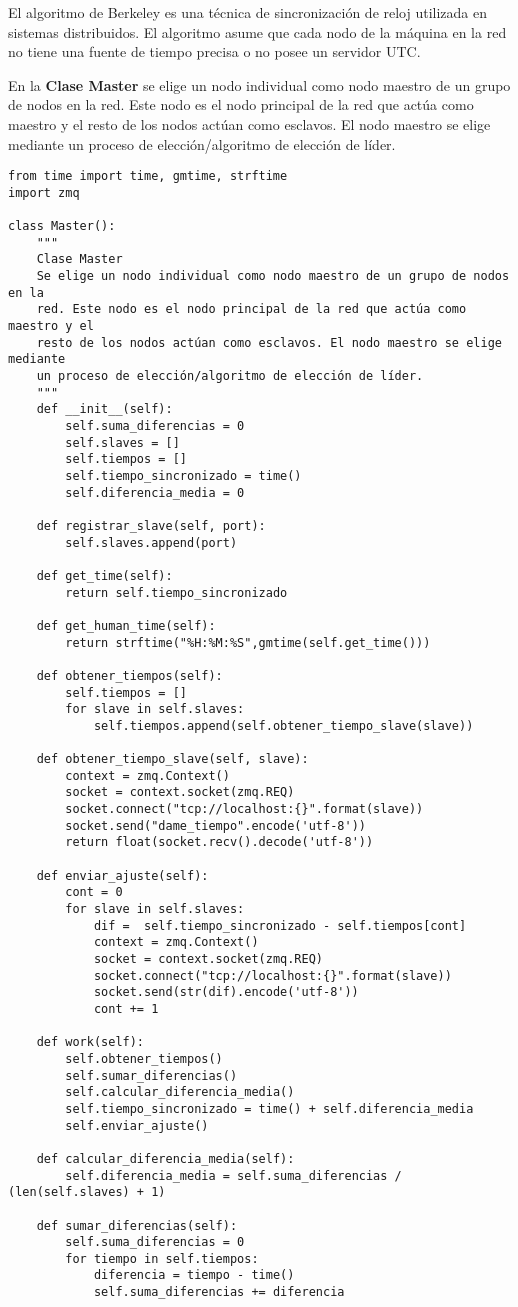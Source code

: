 El algoritmo de Berkeley es una técnica de sincronización de reloj utilizada en
sistemas distribuidos. El algoritmo asume que cada nodo de la máquina en la red
no tiene una fuente de tiempo precisa o no posee un servidor UTC.\@

En la \textbf{Clase Master} se elige un nodo individual como nodo maestro de un
grupo de nodos en la red. Este nodo es el nodo principal de la red que actúa
como maestro y el resto de los nodos actúan como esclavos. El nodo maestro se
elige mediante un proceso de elección/algoritmo de elección de líder.
\begin{verbatim}
from time import time, gmtime, strftime
import zmq

class Master():
    """
    Clase Master
    Se elige un nodo individual como nodo maestro de un grupo de nodos en la
    red. Este nodo es el nodo principal de la red que actúa como maestro y el
    resto de los nodos actúan como esclavos. El nodo maestro se elige mediante
    un proceso de elección/algoritmo de elección de líder.
    """
    def __init__(self):
        self.suma_diferencias = 0
        self.slaves = []
        self.tiempos = []
        self.tiempo_sincronizado = time()
        self.diferencia_media = 0

    def registrar_slave(self, port):
        self.slaves.append(port)

    def get_time(self):
        return self.tiempo_sincronizado

    def get_human_time(self):
        return strftime("%H:%M:%S",gmtime(self.get_time()))

    def obtener_tiempos(self):
        self.tiempos = []
        for slave in self.slaves:
            self.tiempos.append(self.obtener_tiempo_slave(slave))

    def obtener_tiempo_slave(self, slave):
        context = zmq.Context()
        socket = context.socket(zmq.REQ)
        socket.connect("tcp://localhost:{}".format(slave))
        socket.send("dame_tiempo".encode('utf-8'))
        return float(socket.recv().decode('utf-8'))

    def enviar_ajuste(self):
        cont = 0
        for slave in self.slaves:
            dif =  self.tiempo_sincronizado - self.tiempos[cont]
            context = zmq.Context()
            socket = context.socket(zmq.REQ)
            socket.connect("tcp://localhost:{}".format(slave))
            socket.send(str(dif).encode('utf-8'))
            cont += 1

    def work(self):
        self.obtener_tiempos()
        self.sumar_diferencias()
        self.calcular_diferencia_media()
        self.tiempo_sincronizado = time() + self.diferencia_media
        self.enviar_ajuste()

    def calcular_diferencia_media(self):
        self.diferencia_media = self.suma_diferencias / (len(self.slaves) + 1)

    def sumar_diferencias(self):
        self.suma_diferencias = 0
        for tiempo in self.tiempos:
            diferencia = tiempo - time()
            self.suma_diferencias += diferencia
\end{verbatim}
